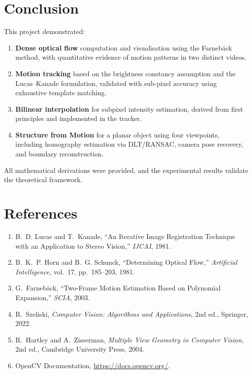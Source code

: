 \documentclass[12pt, a4paper]{article}
\begin{document}
\section{Conclusion}

This project demonstrated:

\begin{enumerate}
  \item \textbf{Dense optical flow} computation and visualisation using the Farneb\"{a}ck method, with quantitative evidence of motion patterns in two distinct videos.
  \item \textbf{Motion tracking} based on the brightness constancy assumption and the Lucas--Kanade formulation, validated with sub-pixel accuracy using exhaustive template matching.
  \item \textbf{Bilinear interpolation} for subpixel intensity estimation, derived from first principles and implemented in the tracker.
  \item \textbf{Structure from Motion} for a planar object using four viewpoints, including homography estimation via DLT/RANSAC, camera pose recovery, and boundary reconstruction.
\end{enumerate}

All mathematical derivations were provided, and the experimental results validate the theoretical framework.


\section*{References}

\begin{enumerate}
  \item B.~D. Lucas and T.~Kanade, ``An Iterative Image Registration Technique with an Application to Stereo Vision,'' \emph{IJCAI}, 1981.
  \item B.~K.~P. Horn and B.~G. Schunck, ``Determining Optical Flow,'' \emph{Artificial Intelligence}, vol.~17, pp.~185--203, 1981.
  \item G.~Farneb\"{a}ck, ``Two-Frame Motion Estimation Based on Polynomial Expansion,'' \emph{SCIA}, 2003.
  \item R.~Szeliski, \emph{Computer Vision: Algorithms and Applications}, 2nd ed., Springer, 2022.
  \item R.~Hartley and A.~Zisserman, \emph{Multiple View Geometry in Computer Vision}, 2nd ed., Cambridge University Press, 2004.
  \item OpenCV Documentation, \url{https://docs.opencv.org/}.
\end{enumerate}
\end{document}
